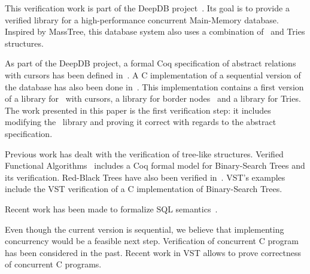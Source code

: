 This verification work is part of the DeepDB project~\cite{deepdb}.
Its goal is to provide a verified library for a high-performance concurrent Main-Memory database.
Inspired by MassTree, this database system also uses a combination of \btrees\ and Tries structures.

As part of the DeepDB project, a formal Coq specification of abstract relations with cursors has been defined in~\cite{brian}.
A C implementation of a sequential version of the database has also been done in~\cite{tosin}.
This implementation contains a first version of a library for \btrees\ with cursors, a library for border nodes~\cite{masstree} and a library for Tries.
The work presented in this paper is the first verification step: it includes modifying the \btrees\ library and proving it correct with regards to the abstract specification.

Previous work has dealt with the verification of tree-like structures.
Verified Functional Algorithms~\cite{vfa} includes a Coq formal model for Binary-Search Trees and its verification.
Red-Black Trees have also been verified in~\cite{redblack}.
VST's examples~\cite{vst} include the VST verification of a C implementation of Binary-Search Trees.

Recent work has been made to formalize SQL semantics~\cite{coqsql}.

Even though the current version is sequential, we believe that implementing concurrency would be a feasible next step.
Verification of concurrent C program has been considered in the past.
Recent work in VST allows to prove correctness of concurrent C programs.


